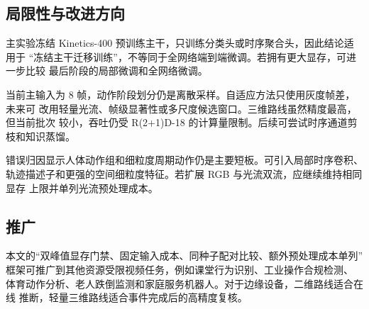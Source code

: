 \subsection{局限性与改进方向}

主实验冻结 Kinetics-400 预训练主干，只训练分类头或时序聚合头，因此结论适用于
“冻结主干迁移训练”，不等同于全网络端到端微调。若拥有更大显存，可进一步比较
最后阶段的局部微调和全网络微调。

当前主输入为 8 帧，动作阶段划分仍是离散采样。自适应方法只使用灰度帧差，未来可
改用轻量光流、帧级显著性或多尺度候选窗口。三维路线虽然精度最高，但当前批次
较小，吞吐仍受 R(2+1)D-18 的计算量限制。后续可尝试时序通道剪枝和知识蒸馏。

错误归因显示人体动作组和细粒度周期动作仍是主要短板。可引入局部时序卷积、
轨迹描述子和更强的空间细粒度特征。若扩展 RGB 与光流双流，应继续维持相同显存
上限并单列光流预处理成本。

\subsection{推广}

本文的“双峰值显存门禁、固定输入成本、同种子配对比较、额外预处理成本单列”
框架可推广到其他资源受限视频任务，例如课堂行为识别、工业操作合规检测、
体育动作分析、老人跌倒监测和家庭服务机器人。对于边缘设备，二维路线适合在线
推断，轻量三维路线适合事件完成后的高精度复核。
